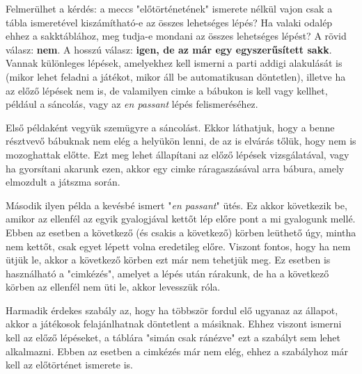 \documentclass[twoside, a4paper, 12pt]{book}
\begin{document}
Felmerülhet a kérdés: a meccs "előtörténetének" ismerete nélkül vajon csak a tábla ismeretével kiszámítható-e az összes lehetséges lépés? Ha valaki odalép ehhez a sakktáblához, meg tudja-e mondani az összes lehetséges lépést? A rövid válasz: \textbf{nem}. A hosszú válasz: \textbf{igen, de az már egy egyszerűsített sakk}. Vannak különleges lépések, amelyekhez kell ismerni a parti addigi alakulását is (mikor lehet feladni a játékot, mikor áll be automatikusan döntetlen), illetve ha az előző lépések nem is, de valamilyen cimke a bábukon is kell vagy kellhet, például a sáncolás, vagy az \textit{en passant} lépés felismeréséhez.

Első példaként vegyük szemügyre a sáncolást. Ekkor láthatjuk, hogy a benne résztvevő bábuknak nem elég a helyükön lenni, de az is elvárás tőlük, hogy nem is mozoghattak előtte. Ezt meg lehet állapítani az előző lépések vizsgálatával, vagy ha gyorsítani akarunk ezen, akkor egy cimke ráragaszásával arra bábura, amely elmozdult a játszma során.

Második ilyen példa a kevésbé ismert "\textit{en passant}" ütés. Ez akkor következik be, amikor az ellenfél az egyik gyalogjával kettőt lép előre pont a mi gyalogunk mellé. Ebben az esetben a következő (és csakis a következő) körben leüthető úgy, mintha nem kettőt, csak egyet lépett volna eredetileg előre. Viszont fontos, hogy ha nem ütjük le, akkor a következő körben ezt már nem tehetjük meg. Ez esetben is használható a "cimkézés", amelyet a lépés után rárakunk, de ha a következő körben az ellenfél nem üti le, akkor levesszük róla.

Harmadik érdekes szabály az, hogy ha többször fordul elő ugyanaz az állapot, akkor a játékosok felajánlhatnak döntetlent a másiknak. Ehhez viszont ismerni kell az előző lépéseket, a táblára "simán csak ránézve" ezt a szabályt sem lehet alkalmazni. Ebben az esetben a cimkézés már nem elég, ehhez a szabályhoz már kell az előtörténet ismerete is.
\end{document}
